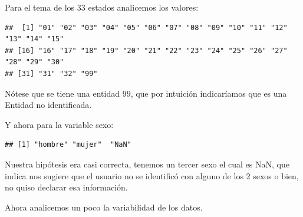 \documentclass[
]{article}
\newenvironment{Shaded}{\begin{snugshade}}{\end{snugshade}}
\newcommand{\DataTypeTok}[1]{\textcolor[rgb]{0.13,0.29,0.53}{#1}}
\newcommand{\KeywordTok}[1]{\textcolor[rgb]{0.13,0.29,0.53}{\textbf{#1}}}
\newcommand{\NormalTok}[1]{#1}
\newcommand{\OperatorTok}[1]{\textcolor[rgb]{0.81,0.36,0.00}{\textbf{#1}}}
\newcommand{\StringTok}[1]{\textcolor[rgb]{0.31,0.60,0.02}{#1}}
\begin{document}
Para el tema de los \(33\) estados analicemos los valores:

\begin{Shaded}
\end{Shaded}

\begin{verbatim}
##  [1] "01" "02" "03" "04" "05" "06" "07" "08" "09" "10" "11" "12" "13" "14" "15"
## [16] "16" "17" "18" "19" "20" "21" "22" "23" "24" "25" "26" "27" "28" "29" "30"
## [31] "31" "32" "99"
\end{verbatim}

Nótese que se tiene una entidad \(99\), que por intuición indicaríamos
que es una Entidad no identificada.

Y ahora para la variable sexo:

\begin{Shaded}
\end{Shaded}

\begin{verbatim}
## [1] "hombre" "mujer"  "NaN"
\end{verbatim}

Nuestra hipótesis era casi correcta, tenemos un tercer sexo el cual es
NaN, que indica nos sugiere que el usuario no se identificó con alguno
de los 2 sexos o bien, no quiso declarar esa información.

Ahora analicemos un poco la variabilidad de los datos.

\begin{Shaded}
\end{Shaded}
\end{document}
